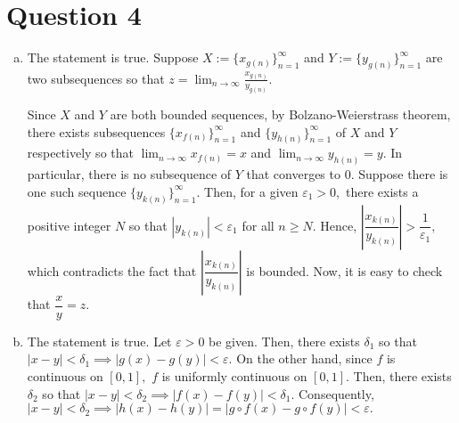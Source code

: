 \documentclass{article}
\begin{document}
\section*{Question 4}
\begin{enumerate}[(a)]
    \item The statement is true. Suppose $X:=\{x_{g(n)}\}^{\infty}_{n=1}$ and $Y:=\{y_{g(n)}\}^{\infty}_{n=1}$ are two subsequences so that $z=\displaystyle\lim_{n\to\infty}\frac{x_{g(n)}}{y_{g(n)}}.$
    
    Since $X$ and $Y$ are both bounded sequences, by Bolzano-Weierstrass theorem, there exists subsequences $\{x_{f(n)}\}^{\infty}_{n=1}$ and $\{y_{h(n)}\}^{\infty}_{n=1}$ of $X$ and $Y$ respectively so that $\displaystyle\lim_{n\to\infty}x_{f(n)}=x$ and $\displaystyle\lim_{n\to\infty}y_{h(n)}=y.$ In particular, there is no subsequence of $Y$ that converges to 0. Suppose there is one such sequence $\{y_{k(n)}\}^{\infty}_{n=1}$. Then, for a given $\varepsilon_1>0,$ there exists a positive integer $N$ so that $|y_{k(n)}|<\varepsilon_1$ for all $n\geq N.$ Hence, $\left|\dfrac{x_{k(n)}}{y_{k(n)}}\right|>\dfrac{1}{\varepsilon_1},$ which contradicts the fact that $\left|\dfrac{x_{k(n)}}{y_{k(n)}}\right|$ is bounded. Now, it is easy to check that $\dfrac{x}{y}=z.$
    \item The statement is true. Let $\varepsilon>0$ be given. Then, there exists $\delta_1$ so that $|x-y|<\delta_1\implies |g(x)-g(y)|<\varepsilon.$ On the other hand, since $f$ is continuous on $[0,1],$ $f$ is uniformly continuous on $[0,1].$ Then, there exists $\delta_2$ so that $|x-y|<\delta_2\implies |f(x)-f(y)|<\delta_1.$ Consequently, $|x-y|<\delta_2\implies |h(x)-h(y)|=|g\circ f(x)-g\circ f(y)|<\varepsilon.$
\end{enumerate}
\end{document}

